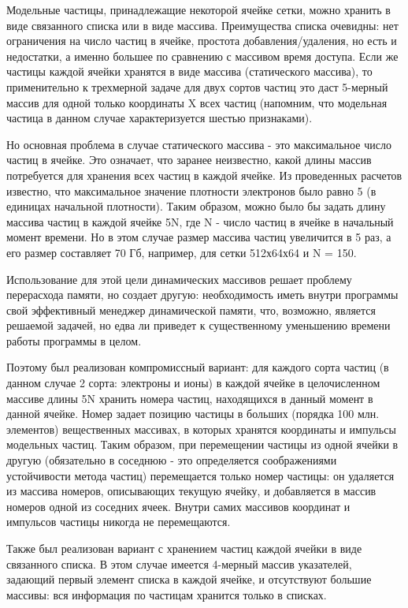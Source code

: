 Модельные частицы, принадлежащие некоторой ячейке сетки, можно хранить в виде связанного списка или в виде массива. Преимущества списка очевидны: нет ограничения на число частиц в ячейке, простота добавления/удаления, но есть и недостатки, а именно большее по сравнению с массивом время доступа. Если же частицы каждой ячейки хранятся в виде массива (статического массива), то применительно к трехмерной задаче для двух сортов частиц это даст 5-мерный массив для одной только координаты X всех частиц (напомним, что модельная частица в данном случае характеризуется шестью признаками). 

Но основная проблема в случае статического массива - это максимальное число частиц в ячейке. Это означает, что заранее неизвестно, какой длины массив потребуется для хранения всех частиц в каждой ячейке. Из проведенных расчетов известно, что максимальное значение плотности электронов было равно 5 (в единицах начальной плотности). Таким образом, можно было бы задать длину массива частиц в каждой ячейке 5N, где N - число частиц в ячейке в начальный момент времени. Но в этом случае размер массива частиц увеличится в 5 раз, а его размер составляет 70 Гб, например, для сетки 512х64х64 и N = 150. 

Использование для этой цели динамических массивов решает проблему перерасхода памяти, но создает другую: необходимость иметь внутри программы свой эффективный менеджер динамической памяти, что, возможно, является решаемой задачей, но едва ли приведет к существенному уменьшению времени работы программы в целом. 

Поэтому был реализован компромиссный вариант: для каждого сорта частиц (в данном случае 2 сорта: электроны и ионы) в каждой ячейке в целочисленном массиве длины 5N хранить номера частиц, находящихся в данный момент в данной ячейке. Номер задает позицию частицы в больших (порядка 100 млн. элементов) вещественных массивах, в которых хранятся координаты и импульсы модельных частиц. Таким образом, при перемещении частицы из одной ячейки в другую (обязательно в соседнюю - это определяется соображениями устойчивости метода частиц) перемещается только номер частицы: он удаляется из массива номеров, описывающих текущую ячейку, и добавляется в массив номеров одной из соседних ячеек. Внутри самих массивов координат и импульсов частицы никогда не перемещаются. 

Также был реализован вариант с хранением частиц каждой ячейки в виде связанного списка. В этом случае имеется 4-мерный массив указателей, задающий первый элемент списка в каждой ячейке, и отсутствуют большие массивы: вся информация по частицам хранится только в списках. 

